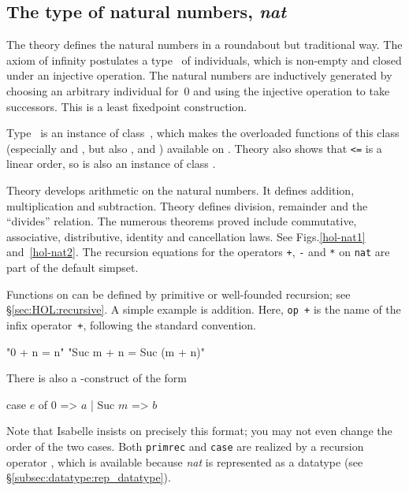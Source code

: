 \subsection{The type of natural numbers, \textit{nat}}

The theory  defines the natural numbers in a roundabout but
traditional way.  The axiom of infinity postulates a type~ of
individuals, which is non-empty and closed under an injective operation.  The
natural numbers are inductively generated by choosing an arbitrary individual
for~0 and using the injective operation to take successors.  This is a least
fixedpoint construction.  

Type~ is an instance of class~, which makes the overloaded
functions of this class (especially \cdx{<} and \cdx{<=}, but also ,
 and ) available on .  Theory  
also shows that {\tt<=} is a linear order, so  is
also an instance of class .

Theory  develops arithmetic on the natural numbers.  It defines
addition, multiplication and subtraction.  Theory  defines
division, remainder and the ``divides'' relation.  The numerous theorems
proved include commutative, associative, distributive, identity and
cancellation laws.  See Figs.\ts\ref{hol-nat1} and~\ref{hol-nat2}.  The
recursion equations for the operators \texttt{+}, \texttt{-} and \texttt{*} on
\texttt{nat} are part of the default simpset.

Functions on  can be defined by primitive or well-founded recursion;
see {\S}\ref{sec:HOL:recursive}.  A simple example is addition.
Here, \texttt{op +} is the name of the infix operator~\texttt{+}, following
the standard convention.
\begin{ttbox}
      "0 + n = n"
  "Suc m + n = Suc (m + n)"
\end{ttbox}
There is also a -construct
of the form
\begin{ttbox}
case \(e\) of 0 => \(a\) | Suc \(m\) => \(b\)
\end{ttbox}
Note that Isabelle insists on precisely this format; you may not even change
the order of the two cases.
Both \texttt{primrec} and \texttt{case} are realized by a recursion operator
, which is available because \textit{nat} is represented as
a datatype (see {\S}\ref{subsec:datatype:rep_datatype}).

